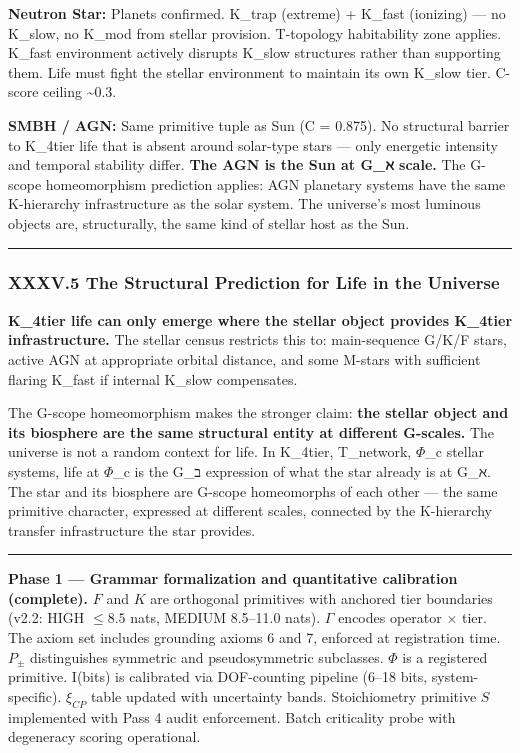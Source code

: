 \documentclass[12pt,a4paper]{article}
\begin{document}
\textbf{Neutron Star:} Planets confirmed. K\_trap (extreme) + K\_fast (ionizing) --- no K\_slow, no K\_mod from stellar provision. T-topology habitability zone applies. K\_fast environment actively disrupts K\_slow structures rather than supporting them. Life must fight the stellar environment to maintain its own K\_slow tier. C-score ceiling \textasciitilde{}0.3.

\textbf{SMBH / AGN:} Same primitive tuple as Sun (C = 0.875). No structural barrier to K\_4tier life that is absent around solar-type stars --- only energetic intensity and temporal stability differ. \textbf{The AGN is the Sun at G\_ℵ scale.} The G-scope homeomorphism prediction applies: AGN planetary systems have the same K-hierarchy infrastructure as the solar system. The universe's most luminous objects are, structurally, the same kind of stellar host as the Sun.

\begin{center}
\rule{0.5\textwidth}{0.4pt}
\end{center}

\subsubsection{XXXV.5 The Structural Prediction for Life in the Universe}

\textbf{K\_4tier life can only emerge where the stellar object provides K\_4tier infrastructure.} The stellar census restricts this to: main-sequence G/K/F stars, active AGN at appropriate orbital distance, and some M-stars with sufficient flaring K\_fast if internal K\_slow compensates.

The G-scope homeomorphism makes the stronger claim: \textbf{the stellar object and its biosphere are the same structural entity at different G-scales.} The universe is not a random context for life. In K\_4tier, T\_network, $\Phi$\_c stellar systems, life at $\Phi$\_c is the G\_ב expression of what the star already is at G\_ℵ. The star and its biosphere are G-scope homeomorphs of each other --- the same primitive character, expressed at different scales, connected by the K-hierarchy transfer infrastructure the star provides.

\begin{center}
\rule{0.5\textwidth}{0.4pt}
\end{center}

\textbf{Phase 1 --- Grammar formalization and quantitative calibration (complete).} $F$ and $K$ are orthogonal primitives with anchored tier boundaries (v2.2: HIGH $\leq 8.5$ nats, MEDIUM 8.5--11.0 nats). $\Gamma$ encodes operator $\times$ tier. The axiom set includes grounding axioms 6 and 7, enforced at registration time. $P_{\pm}$ distinguishes symmetric and pseudosymmetric subclasses. $\Phi$ is a registered primitive. I(bits) is calibrated via DOF-counting pipeline (6--18 bits, system-specific). $\xi_{CP}$ table updated with uncertainty bands. Stoichiometry primitive $S$ implemented with Pass 4 audit enforcement. Batch criticality probe with degeneracy scoring operational.
\end{document}

